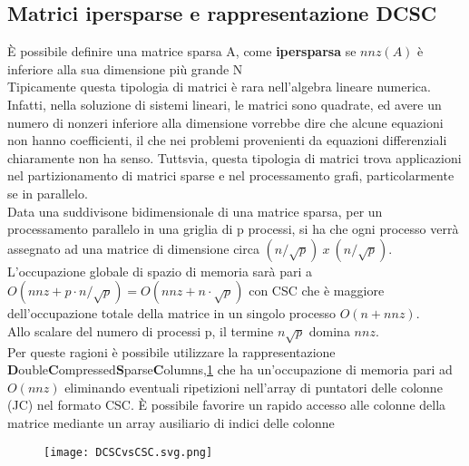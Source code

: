 \subsection{Matrici ipersparse e rappresentazione DCSC}
È possibile definire una matrice sparsa A, come {\bf ipersparsa }se $nnz(A)$ è
inferiore alla sua dimensione più grande N \cite{2dNewIdeas} \\ %
Tipicamente questa tipologia di matrici è rara nell'algebra lineare numerica.
Infatti, nella soluzione di sistemi lineari, le matrici sono quadrate, ed avere un numero di nonzeri inferiore alla dimensione 
vorrebbe dire che alcune equazioni non hanno coefficienti, 
il che nei problemi provenienti da equazioni differenziali chiaramente non ha senso.
Tuttsvia, questa tipologia di matrici trova applicazioni nel partizionamento di matrici sparse 
e nel processamento grafi, particolarmente se in parallelo.\\

Data una suddivisone bidimensionale di una matrice sparsa, %
per un processamento parallelo in una griglia di p processi, si ha che ogni processo
verrà assegnato ad una matrice di dimensione circa $(n/\sqrt{p})~x~(n/\sqrt{p})$. %
L'occupazione globale di spazio di memoria sarà pari a 
$O(nnz + p \cdot n/\sqrt{p}) = O(nnz + n \cdot \sqrt{p})$ con CSC che è maggiore
dell'occupazione totale della matrice in un singolo processo $O(n + nnz)$.\\
Allo scalare del numero di processi p, il termine $n\sqrt{p}$ domina $nnz$.\\

Per queste ragioni è possibile utilizzare la rappresentazione \\
{\bf D}ouble{\bf C}ompressed{\bf S}parse{\bf C}olumns,\ref{fig:DCSCvsCSC}
che ha un'occupazione di memoria pari ad $O(nnz)$
eliminando eventuali ripetizioni nell'array di puntatori delle colonne (JC) nel formato CSC.
È possibile favorire un rapido accesso alle colonne della matrice mediante un
array ausiliario di indici delle colonne \nnz
\begin{figure}[h!]
  \caption[confronto delle rappresentazioni DCSC e CSC ]
  \centering \texttt{[image: DCSCvsCSC.svg.png]} \label{fig:DCSCvsCSC}
\end{figure}

